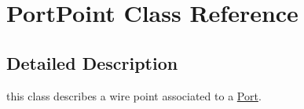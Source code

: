 \hypertarget{class_port_point}{}\section{Port\+Point Class Reference}
\label{class_port_point}


\subsection{Detailed Description}
this class describes a wire point associated to a \mbox{\hyperlink{class_port}{Port}}. 